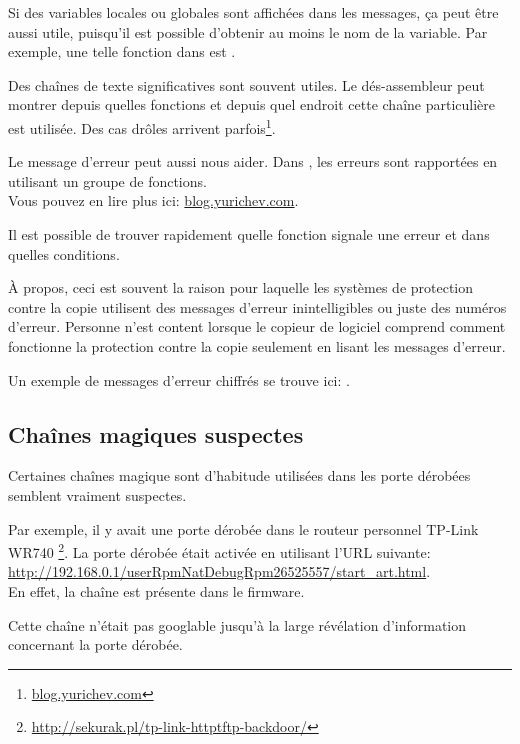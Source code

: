 Si des variables locales ou globales sont affichées dans les messages, ça peut être
aussi utile, puisqu'il est possible d'obtenir au moins le nom de la variable.
Par exemple, une telle fonction dans \oracle est .

Des chaînes de texte significatives sont souvent utiles.
Le dés-assembleur \IDA peut montrer depuis quelles fonctions et depuis quel endroit
cette chaîne particulière est utilisée.
Des cas drôles arrivent parfois\footnote{\href{http://go.yurichev.com/17223}{blog.yurichev.com}}.

Le message d'erreur peut aussi nous aider.
Dans \oracle, les erreurs sont rapportées en utilisant un groupe de fonctions.\\
Vous pouvez en lire plus ici: \href{http://go.yurichev.com/17224}{blog.yurichev.com}.


Il est possible de trouver rapidement quelle fonction signale une erreur et dans
quelles conditions.

À propos, ceci est souvent la raison pour laquelle les systèmes de protection contre
la copie utilisent des messages d'erreur inintelligibles ou juste des numéros d'erreur.
Personne n'est content lorsque le copieur de logiciel comprend comment fonctionne
la protection contre la copie seulement en lisant les messages d'erreur.

Un exemple de messages d'erreur chiffrés se trouve ici: .

\subsection{Chaînes magiques suspectes}

Certaines chaînes magique sont d'habitude utilisées dans les porte dérobées semblent
vraiment suspectes.

Par exemple, il y avait une porte dérobée dans le routeur personnel TP-Link WR740%
\footnote{\url{http://sekurak.pl/tp-link-httptftp-backdoor/}}.
La porte dérobée était activée en utilisant l'URL suivante:\\
\url{http://192.168.0.1/userRpmNatDebugRpm26525557/start_art.html}.\\

En effet, la chaîne  est présente dans le firmware.

Cette chaîne n'était pas googlable jusqu'à la large révélation d'information concernant
la porte dérobée.

